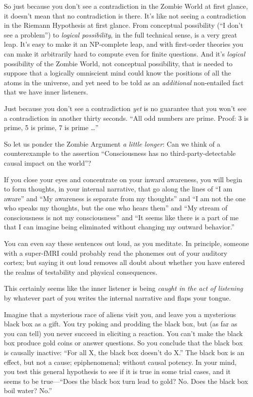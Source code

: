 {
 So just because you don't see a contradiction in
the Zombie World at first glance, it doesn't mean that
no contradiction is there. It's like not seeing a
contradiction in the Riemann Hypothesis at first glance. From
conceptual possibility (``I don't see
a problem'') to \textit{logical possibility}, in the
full technical sense, is a very great leap. It's easy
to make it an NP-complete leap, and with first-order theories you can
make it arbitrarily hard to compute even for finite questions. And
it's \textit{logical} possibility of the Zombie World,
not conceptual possibility, that is needed to suppose that a logically
omniscient mind could know the positions of all the atoms in the
universe, and yet need to be told as an \textit{additional}
non-entailed fact that we have inner listeners.}

{
 Just because you don't see a contradiction
\textit{yet} is no guarantee that you won't see a
contradiction in another thirty seconds. ``All odd
numbers are prime. Proof: 3 is prime, 5 is prime, 7 is prime
\ldots''}

{
 So let us ponder the Zombie Argument \textit{a little longer}: Can
we think of a counterexample to the assertion
``Consciousness has no third-party-detectable causal
impact on the world''?}

{
 If you close your eyes and concentrate on your inward awareness,
you will begin to form thoughts, in your internal narrative, that go
along the lines of ``I am aware''
and ``My awareness is separate from my
thoughts'' and ``I am not the one
who speaks my thoughts, but the one who hears them''
and ``My stream of consciousness is not my
consciousness'' and ``It seems like
there is a part of me that I can imagine being eliminated without
changing my outward behavior.''}

{
 You can even say these sentences out loud, as you meditate. In
principle, someone with a super-fMRI could probably read the phonemes
out of your auditory cortex; but saying it out loud removes all doubt
about whether you have entered the realms of testability and physical
consequences.}

{
 This certainly seems like the inner listener is being
\textit{caught in the act of listening} by whatever part of you writes
the internal narrative and flaps your tongue.}

{
 Imagine that a mysterious race of aliens visit you, and leave you
a mysterious black box as a gift. You try poking and prodding the black
box, but (as far as you can tell) you never succeed in eliciting a
reaction. You can't make the black box produce gold
coins or answer questions. So you conclude that the black box is
causally inactive: ``For all X, the black box
doesn't do X.'' The black box is an
effect, but not a cause; epiphenomenal; without causal potency. In your
mind, you test this general hypothesis to see if it is true in some
trial cases, and it seems to be true---``Does the
black box turn lead to gold? No. Does the black box boil water?
No.''}

